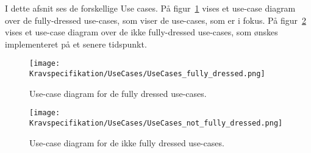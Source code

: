 I dette afsnit ses de forskellige Use cases. På figur~\ref{fig:fullydressedusecases} vises et use-case diagram over de fully-dressed use-cases, som viser de use-cases, som er i fokus. På figur~\ref{fig:ikkefullydressedusecases} vises et use-case diagram over de ikke fully-dressed use-cases, som ønskes implementeret på et senere tidspunkt. 
\begin{figure}[ht]
	\centering
	\texttt{[image: Kravspecifikation/UseCases/UseCases\_fully\_dressed.png]}
	\caption{Use-case diagram for de fully dressed use-cases.}
	\label{fig:fullydressedusecases}
\end{figure}

\begin{figure}[ht]
	\centering
	\texttt{[image: Kravspecifikation/UseCases/UseCases\_not\_fully\_dressed.png]}
	\caption{Use-case diagram for de ikke fully dressed use-cases.}
	\label{fig:ikkefullydressedusecases}
\end{figure}
\newpage







